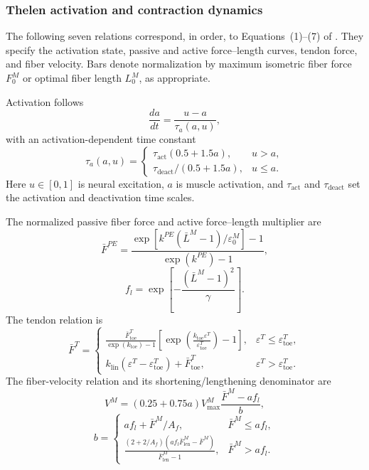 \subsubsection{Thelen activation and contraction dynamics}

The following seven relations correspond, in order, to Equations~(1)--(7) of \citet{thelen_adjustment_2003}. They specify the activation state, passive and active force--length curves, tendon force, and fiber velocity. Bars denote normalization by maximum isometric fiber force $F_0^M$ or optimal fiber length $L_0^M$, as appropriate.

Activation follows
\begin{equation}
 \frac{da}{dt}=\frac{u-a}{\tau_a(a,u)},
 \label{eq:app_thelen1}
\end{equation}
with an activation-dependent time constant
\begin{equation}
 \tau_a(a,u)=\begin{cases}
 \tau_{\mathrm{act}}(0.5+1.5a),&u>a,\\
 \tau_{\mathrm{deact}}/(0.5+1.5a),&u\leq a.
 \end{cases}
 \label{eq:app_thelen2}
\end{equation}
Here $u\in[0,1]$ is neural excitation, $a$ is muscle activation, and $\tau_{\mathrm{act}}$ and $\tau_{\mathrm{deact}}$ set the activation and deactivation time scales.

The normalized passive fiber force and active force--length multiplier are
\begin{equation}
 \bar F^{PE}=\frac{\exp\!\left[k^{PE}(\bar L^M-1)/\varepsilon_0^M\right]-1}
 {\exp(k^{PE})-1},
 \label{eq:app_thelen3}
\end{equation}
\begin{equation}
 f_l=\exp\!\left[-\frac{(\bar L^M-1)^2}{\gamma}\right].
 \label{eq:app_thelen4}
\end{equation}
The tendon relation is
\begin{equation}
 \bar F^T=\begin{cases}
 \displaystyle\frac{\bar F^T_{\mathrm{toe}}}{\exp(k_{\mathrm{toe}})-1}
 \left[\exp\!\left(\frac{k_{\mathrm{toe}}\varepsilon^T}{\varepsilon^T_{\mathrm{toe}}}\right)-1\right],
 &\varepsilon^T\leq\varepsilon^T_{\mathrm{toe}},\\[6pt]
 k_{\mathrm{lin}}(\varepsilon^T-\varepsilon^T_{\mathrm{toe}})+\bar F^T_{\mathrm{toe}},
 &\varepsilon^T>\varepsilon^T_{\mathrm{toe}}.
 \end{cases}
 \label{eq:app_thelen5}
\end{equation}
The fiber-velocity relation and its shortening/lengthening denominator are
\begin{equation}
 V^M=(0.25+0.75a)V^M_{\max}\frac{\bar F^M-a f_l}{b},
 \label{eq:app_thelen6}
\end{equation}
\begin{equation}
 b=\begin{cases}
 a f_l+\bar F^M/A_f,&\bar F^M\leq a f_l,\\[4pt]
 \displaystyle\frac{(2+2/A_f)(a f_l\bar F^M_{\mathrm{len}}-\bar F^M)}
 {\bar F^M_{\mathrm{len}}-1},&\bar F^M>a f_l.
 \end{cases}
 \label{eq:app_thelen7}
\end{equation}

